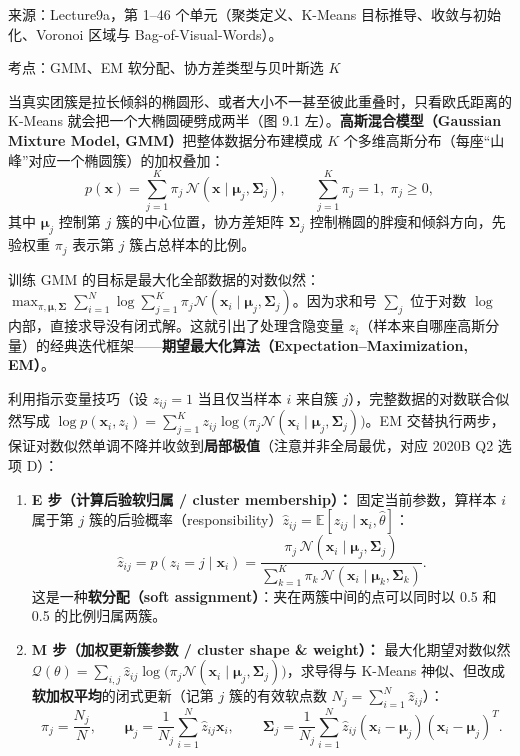 来源：Lecture9a，第 1–46 个单元（聚类定义、K-Means 目标推导、收敛与初始化、Voronoi 区域与 Bag-of-Visual-Words）。



考点：GMM、EM 软分配、协方差类型与贝叶斯选 $K$ 

当真实团簇是拉长倾斜的椭圆形、或者大小不一甚至彼此重叠时，只看欧氏距离的 K-Means 就会把一个大椭圆硬劈成两半（图 9.1 左）。\textbf{高斯混合模型（Gaussian Mixture Model, GMM）}把整体数据分布建模成 $K$ 个多维高斯分布（每座“山峰”对应一个椭圆簇）的加权叠加：
\[
p(\mathbf{x}) = \sum_{j=1}^K \pi_j\,\mathcal{N}(\mathbf{x} \mid \boldsymbol{\mu}_j, \boldsymbol{\Sigma}_j),
\qquad
\sum_{j=1}^K \pi_j = 1,\;\pi_j \ge 0,
\tag{9.4}
\]
其中 $\boldsymbol{\mu}_j$ 控制第 $j$ 簇的中心位置，协方差矩阵 $\boldsymbol{\Sigma}_j$ 控制椭圆的胖瘦和倾斜方向，先验权重 $\pi_j$ 表示第 $j$ 簇占总样本的比例。

训练 GMM 的目标是最大化全部数据的对数似然：$\max_{\pi,\boldsymbol{\mu},\boldsymbol{\Sigma}} \sum_{i=1}^N \log \sum_{j=1}^K \pi_j \mathcal{N}(\mathbf{x}_i \mid \boldsymbol{\mu}_j, \boldsymbol{\Sigma}_j)$。因为求和号 $\sum_j$ 位于对数 $\log$ 内部，直接求导没有闭式解。这就引出了处理含隐变量 $z_i$（样本来自哪座高斯分量）的经典迭代框架——\textbf{期望最大化算法（Expectation–Maximization, EM）}。

利用指示变量技巧（设 $z_{ij}=1$ 当且仅当样本 $i$ 来自簇 $j$），完整数据的对数联合似然写成 $\log p(\mathbf{x}_i, z_i) = \sum_{j=1}^K z_{ij}\log\bigl(\pi_j \mathcal{N}(\mathbf{x}_i\mid \boldsymbol{\mu}_j, \boldsymbol{\Sigma}_j)\bigr)$。EM 交替执行两步，保证对数似然单调不降并收敛到\textbf{局部极值}（注意并非全局最优，对应 2020B Q2 选项 D）：
\begin{enumerate}
\item \textbf{E 步（计算后验软归属 / cluster membership）：} 固定当前参数，算样本 $i$ 属于第 $j$ 簇的后验概率（responsibility）$\hat{z}_{ij} = \mathbb{E}[z_{ij}\mid \mathbf{x}_i,\hat{\theta}]$：
\[
\hat{z}_{ij} = p(z_i = j \mid \mathbf{x}_i) = \frac{\pi_j\,\mathcal{N}(\mathbf{x}_i \mid \boldsymbol{\mu}_j, \boldsymbol{\Sigma}_j)}{\sum_{k=1}^K \pi_k\,\mathcal{N}(\mathbf{x}_i \mid \boldsymbol{\mu}_k, \boldsymbol{\Sigma}_k)}.
\tag{9.5}
\]
这是一种\textbf{软分配（soft assignment）}：夹在两簇中间的点可以同时以 0.5 和 0.5 的比例归属两簇。
\item \textbf{M 步（加权更新簇参数 / cluster shape \& weight）：} 最大化期望对数似然 $\mathcal{Q}(\theta) = \sum_{i,j}\hat{z}_{ij}\log\bigl(\pi_j\mathcal{N}(\mathbf{x}_i\mid\boldsymbol{\mu}_j,\boldsymbol{\Sigma}_j)\bigr)$，求导得与 K-Means 神似、但改成\textbf{软加权平均}的闭式更新（记第 $j$ 簇的有效软点数 $N_j = \sum_{i=1}^N \hat{z}_{ij}$）：
\[
\pi_j = \frac{N_j}{N}, \qquad
\boldsymbol{\mu}_j = \frac{1}{N_j}\sum_{i=1}^N \hat{z}_{ij}\mathbf{x}_i, \qquad
\boldsymbol{\Sigma}_j = \frac{1}{N_j}\sum_{i=1}^N \hat{z}_{ij}(\mathbf{x}_i - \boldsymbol{\mu}_j)(\mathbf{x}_i - \boldsymbol{\mu}_j)^T.
\tag{9.6}
\]
\end{enumerate}

